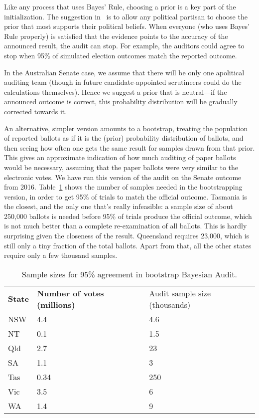 \documentclass[10pt,a4paper]{article}
\begin{document}
Like any process that uses Bayes' Rule, choosing a prior is a key part
of the initialization.  The suggestion in~\cite{rivest2012bayesian} is
to allow any political partisan to choose the prior that most supports
their political beliefs.  When everyone (who uses Bayes' Rule
properly) is satisfied that the evidence points to the accuracy of the
announced result, the audit can stop.  For example, the auditors could
agree to stop when 95\% of simulated election outcomes match the
reported outcome.

In the Australian Senate case, we assume that there will be only one
apolitical auditing team (though in future candidate-appointed
scrutineers could do the calculations themselves).  Hence we suggest a
prior that is neutral---if the announced outcome is correct, this
probability distribution will be gradually corrected towards it.

An alternative, simpler version amounts to a bootstrap, treating the
population of reported ballots as if it is the (prior) probability
distribution of ballots, and then seeing how often one gets the same
result for samples drawn from that prior.  
This gives an approximate
indication of how much auditing of paper ballots would be necessary, assuming that 
the paper ballots were very similar to the electronic votes.
We have run this version of the audit 
on the Senate outcome from 2016.  
Table~\ref{tab:bootstrapping} shows the number of samples needed in the bootstrapping version, in order to get 95\% of trials to match the official outcome.
Tasmania is the closest, and the only one that's really infeasible: a sample size of about 
250,000 ballots is needed before 95\% of trials produce the official outcome, which is not much better than
a complete re-examination of all ballots.  This is hardly surprising given the closeness of the result. 
Queensland requires 23,000, which is still only a tiny fraction of the total ballots.  
Apart from that, all the other states require only a few thousand samples.

\begin{table}
\begin{tabular}{lll}
{\bf State} & {\bf Number of votes (millions)} & {Audit sample size (thousands)} \\
NSW & 4.4 & 4.6 \\
NT & 0.1 & 1.5 \\
Qld & 2.7 & 23 \\
SA & 1.1 & 3 \\
Tas & 0.34 & 250 \\
Vic & 3.5 & 6 \\
WA  & 1.4 & 9 \\
\end{tabular}
\caption{Sample sizes for 95\% agreement in bootstrap Bayesian Audit.}
\label{tab:bootstrapping}
\end{table}
\end{document}
